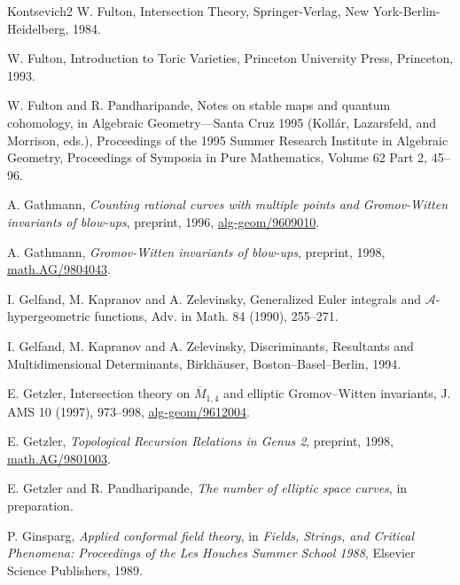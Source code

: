 \begin{thebibliography}{Kontsevich2}
\hypertarget{bib:Fulton2}{}
W. Fulton, Intersection Theory, Springer-Verlag, New York-Berlin-Heidelberg, 1984.

\hypertarget{bib:Fulton3}{}
W. Fulton, Introduction to Toric Varieties,
Princeton University Press, Princeton, 1993.

\hypertarget{bib:FP}{}
W. Fulton and R. Pandharipande, Notes on stable maps and quantum cohomology, in Algebraic Geometry---Santa Cruz 1995 (Kollár, Lazarsfeld, and Morrison, eds.), Proceedings of the 1995 Summer Research Institute in Algebraic Geometry, Proceedings of Symposia in Pure Mathematics, Volume 62 Part 2, 45--96.


\hypertarget{bib:Gathmann1}{} A. Gathmann, \emph{Counting rational curves with multiple points and Gromov-Witten invariants of blow-ups}, preprint, 1996, \href{https://arxiv.org/abs/alg-geom/9609010}{alg-geom/9609010}.

\hypertarget{bib:Gathmann2}{} A. Gathmann, \emph{Gromov-Witten invariants of blow-ups}, preprint, 1998, \href{https://arxiv.org/abs/math.AG/9804043}{math.AG/9804043}.

\hypertarget{bib:GKZ1}{}
I. Gelfand, M. Kapranov and A. Zelevinsky, Generalized Euler integrals and
$\mathcal A$-hypergeometric functions, Adv. in Math. 84 (1990), 255--271.

\hypertarget{bib:GKZ2}{}
I. Gelfand, M. Kapranov and A. Zelevinsky, Discriminants, Resultants and
Multidimensional Determinants, Birkhäuser, Boston--Basel--Berlin, 1994.

\hypertarget{bib:Getzler1}{}
E. Getzler, Intersection theory on $\overline M_{1,4}$ and elliptic Gromov--Witten invariants, J. AMS 10 (1997), 973--998, \href{https://arxiv.org/abs/alg-geom/9612004}{alg-geom/9612004}.

\hypertarget{bib:Getzler2}{}
E. Getzler, \emph{Topological Recursion Relations in Genus 2}, preprint, 1998, \href{https://arxiv.org/abs/math/9801003}{math.AG/9801003}.

\hypertarget{bib:GeP}{} E. Getzler and R. Pandharipande, \emph{The number of elliptic space curves}, in preparation.

\hypertarget{bib:Ginsparg}{} P. Ginsparg, \emph{Applied conformal field theory}, in \emph{Fields, Strings, and Critical Phenomena: Proceedings of the Les Houches Summer School 1988}, Elsevier Science Publishers, 1989.


\end{thebibliography}
